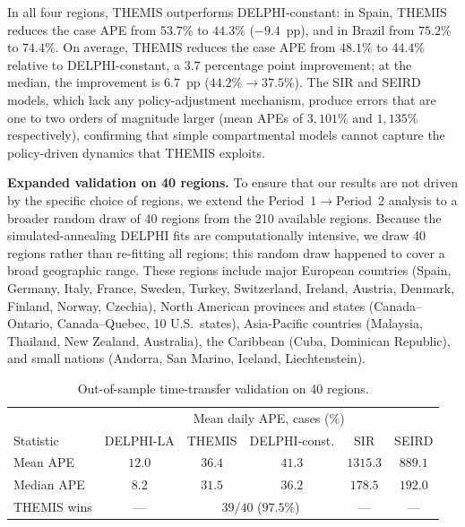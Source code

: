 \documentclass[letterpaper,twoside,11pt]{reviewresponse}
\begin{document}
In all four regions, THEMIS outperforms DELPHI-constant: in Spain, THEMIS reduces the case APE from $53.7\%$ to $44.3\%$ ($-9.4$~pp), and in Brazil from $75.2\%$ to $74.4\%$. On average, THEMIS reduces the case APE from $48.1\%$ to $44.4\%$ relative to DELPHI-constant, a $3.7$ percentage point improvement; at the median, the improvement is $6.7$~pp ($44.2\% \to 37.5\%$). The SIR and SEIRD models, which lack any policy-adjustment mechanism, produce errors that are one to two orders of magnitude larger (mean APEs of $3{,}101\%$ and $1{,}135\%$ respectively), confirming that simple compartmental models cannot capture the policy-driven dynamics that THEMIS exploits.

\textbf{Expanded validation on 40 regions.} To ensure that our results are not driven by the specific choice of regions, we extend the Period~1$\to$Period~2 analysis to a broader random draw of 40 regions from the 210 available regions. Because the simulated-annealing DELPHI fits are computationally intensive, we draw 40 regions rather than re-fitting all regions; this random draw happened to cover a broad geographic range. These regions include major European countries (Spain, Germany, Italy, France, Sweden, Turkey, Switzerland, Ireland, Austria, Denmark, Finland, Norway, Czechia), North American provinces and states (Canada--Ontario, Canada--Quebec, 10 U.S.\ states), Asia-Pacific countries (Malaysia, Thailand, New Zealand, Australia), the Caribbean (Cuba, Dominican Republic), and small nations (Andorra, San Marino, Iceland, Liechtenstein).

\begin{table}[h!]
	\centering
	\begin{tabular}{|l|ccccc|}
		\hline
		& \multicolumn{5}{c|}{Mean daily APE, cases (\%)} \\
		Statistic & DELPHI-LA  & THEMIS & DELPHI-const. & SIR & SEIRD \\\hline
		Mean APE   & $12.0$  & $\mathbf{36.4}$ & $41.3$ & $1315.3$ & $889.1$ \\
		Median APE & $8.2$   & $\mathbf{31.5}$ & $36.2$ & $178.5$  & $192.0$ \\
		THEMIS wins & ---  & \multicolumn{2}{c}{$39/40$ ($97.5\%$)} & --- & --- \\\hline
	\end{tabular}
	\caption{Out-of-sample time-transfer validation on 40 regions.}
	\label{tab:time_transfer_expanded_r1}
\end{table}
\end{document}
